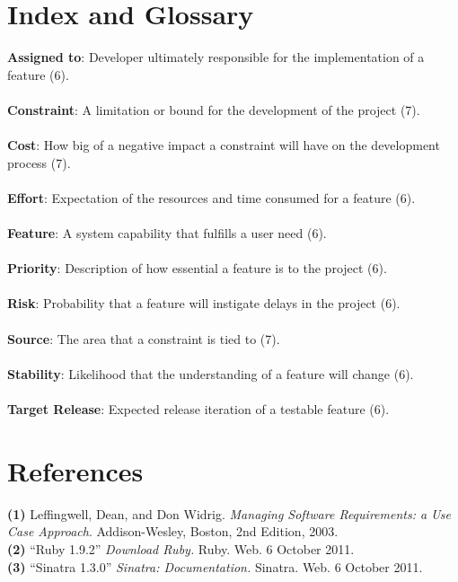 \documentclass{article}
\begin{document}
\section{Index and Glossary}
\textbf{Assigned to}: Developer ultimately responsible for the implementation of a feature (6).\\ \\
\textbf{Constraint}: A limitation or bound for the development of the project (7).\\ \\
\textbf{Cost}: How big of a negative impact a constraint will have on the development process (7).\\ \\
\textbf{Effort}: Expectation of the resources and time consumed for a feature (6).\\ \\
\textbf{Feature}: A system capability that fulfills a user need (6).\\ \\
\textbf{Priority}: Description of how essential a feature is to the project (6).\\ \\
\textbf{Risk}: Probability that a feature will instigate delays in the project (6).\\ \\
\textbf{Source}: The area that a constraint is tied to (7).\\ \\
\textbf{Stability}: Likelihood that the understanding of a feature will change (6).\\ \\
\textbf{Target Release}: Expected release iteration of a testable feature (6).

\section{References}
\hangindent=1.4cm
\textbf{(1)} Leffingwell, Dean, and Don Widrig.
\emph{Managing Software Requirements: a Use Case Approach}.
Addison-Wesley, Boston,
2nd Edition,
2003.\\

\noindent\hangindent=1.4cm
\textbf{(2)} ``Ruby 1.9.2'' 
\emph{Download Ruby.} Ruby. Web.  6 October 2011. \\

\noindent\hangindent=1.4cm
\textbf{(3)} ``Sinatra 1.3.0'' 
\emph{Sinatra: Documentation.} Sinatra. Web.  6 October 2011.\\
\end{document}
